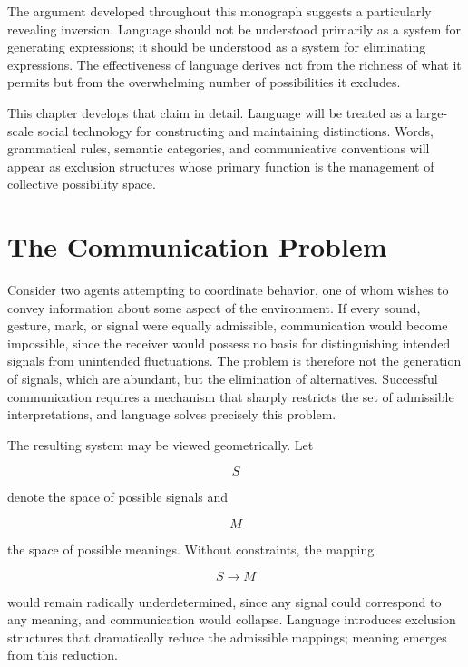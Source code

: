 \documentclass[11pt,oneside]{book}
\theoremstyle{plain}
\theoremstyle{definition}
\theoremstyle{remark}
\begin{document}
The argument developed throughout this monograph suggests a particularly revealing inversion. Language should not be understood primarily as a system for generating expressions; it should be understood as a system for eliminating expressions. The effectiveness of language derives not from the richness of what it permits but from the overwhelming number of possibilities it excludes.

This chapter develops that claim in detail. Language will be treated as a large-scale social technology for constructing and maintaining distinctions. Words, grammatical rules, semantic categories, and communicative conventions will appear as exclusion structures whose primary function is the management of collective possibility space.

\section{The Communication Problem}

Consider two agents attempting to coordinate behavior, one of whom wishes to convey information about some aspect of the environment. If every sound, gesture, mark, or signal were equally admissible, communication would become impossible, since the receiver would possess no basis for distinguishing intended signals from unintended fluctuations. The problem is therefore not the generation of signals, which are abundant, but the elimination of alternatives. Successful communication requires a mechanism that sharply restricts the set of admissible interpretations, and language solves precisely this problem.

The resulting system may be viewed geometrically. Let

\begin{equation}
S
\end{equation}

denote the space of possible signals and

\begin{equation}
M
\end{equation}

the space of possible meanings. Without constraints, the mapping

\begin{equation}
S
\rightarrow M
\end{equation}

would remain radically underdetermined, since any signal could correspond to any meaning, and communication would collapse. Language introduces exclusion structures that dramatically reduce the admissible mappings; meaning emerges from this reduction.
\end{document}
